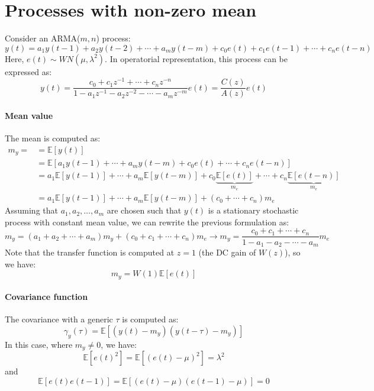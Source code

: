 \section{Processes with non-zero mean}

Consider an ARMA($m,n$) process:
\[y(t)=a_1y(t-1)+a_2y(t-2)+\cdots+a_m y(t-m)+c_0e(t)+c_1e(t-1)+\cdots+c_n e(t-n) \]
Here, $e(t)\sim WN(\mu,\lambda^2)$.
In operatorial representation, this process can be expressed as:
\[y(t)=\dfrac{c_0+c_1z^{-1}+\cdots+c_n z^{-n}}{1- a_1z^{-1}-a_2z^{-2}-\cdots-a_m z^{-m}}e(t)=\dfrac{C(z)}{A(z)}e(t)\]

\paragraph*{Mean value}
The mean is computed as:
\begin{align*}
    m_y=    &= \mathbb{E}\left[y(t)\right]  \\
            &= \mathbb{E}\left[a_1y(t-1)+\cdots+a_m y(t-m)+c_0e(t)+\cdots+c_n e(t-n)\right] \\
            &= a_1\mathbb{E}\left[y(t-1)\right]+\cdots+a_m\mathbb{E}\left[y(t-m)\right]+c_0\underbrace{\mathbb{E}\left[e(t)\right]}_{m_e} +\cdots+c_n\underbrace{\mathbb{E}\left[e(t-n)\right]}_{m_e} \\
            &= a_1\mathbb{E}\left[y(t-1)\right]+\cdots+a_m\mathbb{E}\left[y(t-m)\right]+\left(c_0 +\cdots+c_n\right)m_e 
\end{align*}
Assuming that $a_1,a_2,\dots,a_m$ are chosen such that $y(t)$ is a stationary stochastic process with constant mean value, we can rewrite the previous formulation as:
\[m_y=\left(a_1+a_2+\cdots+a_m\right)m_y+\left(c_0 +c_1 +\cdots+c_n\right)m_e \rightarrow m_y =\dfrac{c_0 +c_1 +\cdots+c_n}{1-a_1-a_2-\cdots-a_m}m_e\]
Note that the transfer function is computed at $z=1$ (the DC gain of $W(z)$), so we have:
\[m_y=W(1)\mathbb{E}\left[e(t)\right]\]

\paragraph*{Covariance function}
The covariance with a generic $\tau$ is computed as:
\[\gamma_y(\tau)  = \mathbb{E}\left[\left(y(t)-m_y\right)\left(y(t-\tau)-m_y\right)\right]\]
In this case, where $m_y \neq 0$, we have:
\[\mathbb{E}\left[{e(t)}^2\right]=\mathbb{E}\left[{\left(e(t)-\mu\right)}^2\right]= \lambda^2\]
and 
\[\mathbb{E}\left[e(t)e(t-1)\right]=\mathbb{E}\left[\left(e(t)-\mu\right)\left(e(t-1)-\mu\right)\right]= 0\]

